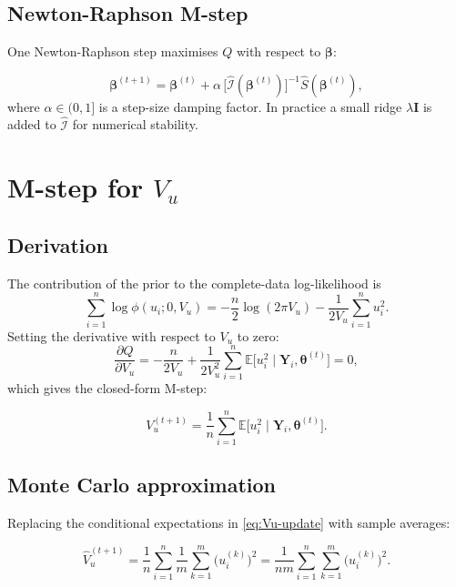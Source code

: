 \documentclass[11pt,a4paper]{article}
\theoremstyle{definition}
\theoremstyle{remark}
\newcommand{\E}{\mathbb{E}}
\newcommand{\bY}{\mathbf{Y}}
\newcommand{\bbeta}{\boldsymbol{\beta}}
\newcommand{\btheta}{\boldsymbol{\theta}}
\newcommand{\given}{\mid}
\begin{document}
\subsection{Newton-Raphson M-step}

One Newton-Raphson step maximises $Q$ with respect to $\bbeta$:

\begin{equation}
  \bbeta^{(t+1)} = \bbeta^{(t)} + \alpha\,
    \bigl[\hat{\mathcal{I}}(\bbeta^{(t)})\bigr]^{-1}
    \hat{S}(\bbeta^{(t)}),
  \label{eq:nr-update}
\end{equation}
where $\alpha \in (0,1]$ is a step-size damping factor.
In practice a small ridge $\lambda \mathbf{I}$ is added to
$\hat{\mathcal{I}}$ for numerical stability.

\section{M-step for \texorpdfstring{$V_u$}{Vu}}

\subsection{Derivation}

The contribution of the prior to the complete-data log-likelihood is
\[
  \sum_{i=1}^n \log \phi(u_i; 0, V_u)
    = -\frac{n}{2}\log(2\pi V_u) - \frac{1}{2V_u}\sum_{i=1}^n u_i^2.
\]
Setting the derivative with respect to $V_u$ to zero:
\[
  \frac{\partial Q}{\partial V_u} = -\frac{n}{2V_u}
    + \frac{1}{2V_u^2}\sum_{i=1}^n \E\bigl[u_i^2 \given \bY_i, \btheta^{(t)}\bigr] = 0,
\]
which gives the closed-form M-step:

\begin{equation}
  V_u^{(t+1)} = \frac{1}{n}\sum_{i=1}^n \E\bigl[u_i^2 \given \bY_i, \btheta^{(t)}\bigr].
  \label{eq:Vu-update}
\end{equation}

\subsection{Monte Carlo approximation}

Replacing the conditional expectations in \eqref{eq:Vu-update} with sample averages:

\begin{equation}
  \widehat{V}_u^{(t+1)}
    = \frac{1}{n}\sum_{i=1}^n \frac{1}{m}\sum_{k=1}^m \bigl(u_i^{(k)}\bigr)^2
    = \frac{1}{nm}\sum_{i=1}^{n}\sum_{k=1}^{m}\bigl(u_i^{(k)}\bigr)^2.
\end{equation}
\end{document}
